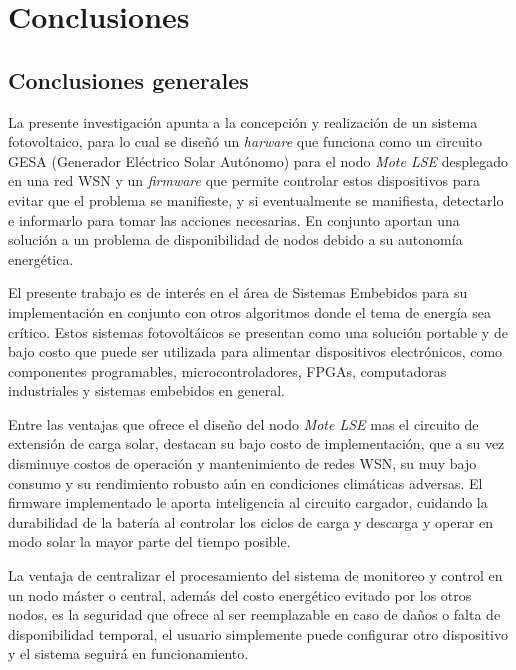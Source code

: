 
\chapter{Conclusiones} %

\label{Chapter5} %

\section{Conclusiones generales}

La presente investigación apunta a la concepción y realización de un sistema fotovoltaico, para lo cual se diseñó un \textit{harware} que funciona como un circuito GESA (Generador Eléctrico Solar Autónomo) para el nodo \textit{Mote LSE} desplegado en una red WSN y un \textit{firmware} que permite controlar estos dispositivos para evitar que el problema se manifieste, y si eventualmente se manifiesta, detectarlo e informarlo para tomar las acciones necesarias. En conjunto aportan una solución a un problema de disponibilidad de nodos debido a su autonomía energética.

El presente trabajo es de interés en el área de Sistemas Embebidos para su implementación en conjunto con otros algoritmos donde el tema de energía sea crítico. Estos sistemas fotovoltáicos se presentan como una solución portable y de bajo costo que puede ser utilizada para alimentar dispositivos electrónicos, como componentes programables, microcontroladores, FPGAs, computadoras industriales y sistemas embebidos en general.

Entre las ventajas que ofrece el diseño del nodo \textit{Mote LSE} mas el circuito de extensión de carga solar, destacan su bajo costo de implementación, que a su vez disminuye costos de operación y mantenimiento de redes WSN, su muy bajo consumo y su rendimiento robusto aún en condiciones climáticas adversas. El firmware implementado le aporta inteligencia al circuito cargador, cuidando la durabilidad de la batería al controlar los ciclos de carga y descarga y operar en modo solar la mayor parte del tiempo posible.

La ventaja de centralizar el procesamiento del sistema de monitoreo y control en un nodo máster o central, además del costo energético evitado por los otros nodos, es la seguridad que ofrece al ser reemplazable en caso de daños o falta de disponibilidad temporal, el usuario simplemente puede configurar otro dispositivo y el sistema seguirá en funcionamiento.

